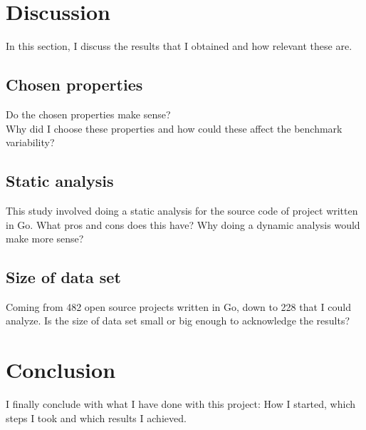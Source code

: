 \documentclass{seal_thesis}
\begin{document}
\chapter{Discussion}
In this section, I discuss the results that I obtained and how relevant these are.
\section{Chosen properties}
Do the chosen properties make sense? \\
Why did I choose these properties and how could these affect the benchmark variability? \\

\section{Static analysis}
This study involved doing a static analysis for the source code of project written in Go. What pros and cons does this have? Why doing a dynamic analysis would make more sense?

\section{Size of data set}
Coming from 482 open source projects written in Go, down to 228 that I could analyze. Is the size of data set small or big enough to acknowledge the results?

\chapter{Conclusion}
I finally conclude with what I have done with this project: How I started, which steps I took and which results I achieved.


\backmatter


\end{document}
